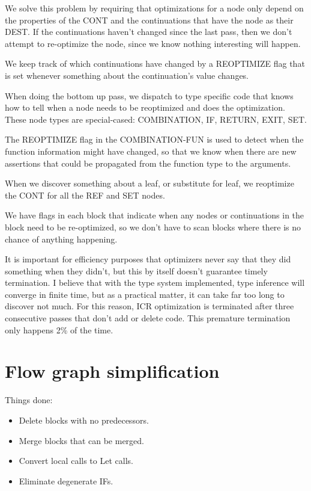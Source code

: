We solve this problem by requiring that optimizations for a node only depend on
the properties of the CONT and the continuations that have the node as their
DEST.  If the continuations haven't changed since the last pass, then we don't
attempt to re-optimize the node, since we know nothing interesting will happen.

We keep track of which continuations have changed by a REOPTIMIZE flag that is
set whenever something about the continuation's value changes.

When doing the bottom up pass, we dispatch to type specific code that knows how
to tell when a node needs to be reoptimized and does the optimization.  These
node types are special-cased: COMBINATION, IF, RETURN, EXIT, SET.

The REOPTIMIZE flag in the COMBINATION-FUN is used to detect when the function
information might have changed, so that we know when there are new assertions
that could be propagated from the function type to the arguments.

When we discover something about a leaf, or substitute for leaf, we reoptimize
the CONT for all the REF and SET nodes. 

We have flags in each block that indicate when any nodes or continuations in
the block need to be re-optimized, so we don't have to scan blocks where there
is no chance of anything happening.

It is important for efficiency purposes that optimizers never say that they did
something when they didn't, but this by itself doesn't guarantee timely
termination.  I believe that with the type system implemented, type inference
will converge in finite time, but as a practical matter, it can take far too
long to discover not much.  For this reason, ICR optimization is terminated
after three consecutive passes that don't add or delete code.  This premature
termination only happens 2\% of the time.


\section{Flow graph simplification}

Things done:

\begin{itemize}
\item Delete blocks with no predecessors.
\item Merge blocks that can be merged.
\item Convert local calls to Let calls.
\item Eliminate degenerate IFs.
\end{itemize}

